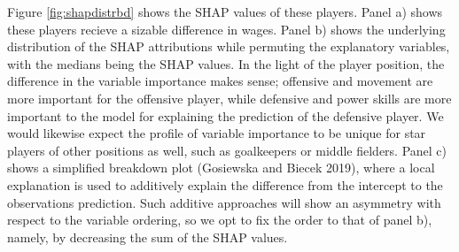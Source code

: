 \documentclass[
]{article}
\begin{document}
Figure \ref{fig:shapdistrbd} shows the SHAP values of these players. Panel a) shows these players recieve a sizable difference in wages. Panel b) shows the underlying distribution of the SHAP attributions while permuting the explanatory variables, with the medians being the SHAP values. In the light of the player position, the difference in the variable importance makes sense; offensive and movement are more important for the offensive player, while defensive and power skills are more important to the model for explaining the prediction of the defensive player. We would likewise expect the profile of variable importance to be unique for star players of other positions as well, such as goalkeepers or middle fielders. Panel c) shows a simplified breakdown plot (Gosiewska and Biecek 2019), where a local explanation is used to additively explain the difference from the intercept to the observations prediction. Such additive approaches will show an asymmetry with respect to the variable ordering, so we opt to fix the order to that of panel b), namely, by decreasing the sum of the SHAP values.
\end{document}
